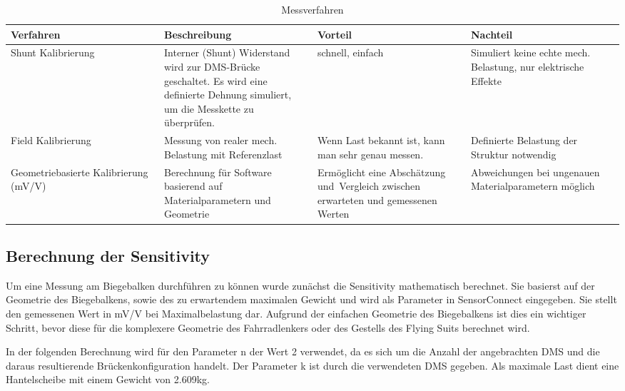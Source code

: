 \bgroup
\def\arraystretch{2}
\begin{table}[h]
\centering
\begin{tabular}{|p{0.25\linewidth}|p{0.25\linewidth}|p{0.25\linewidth}|p{0.25\linewidth}|}
\hline
Verfahren & Beschreibung & Vorteil & Nachteil\\ \hline
Shunt Kalibrierung & Interner (Shunt) Widerstand wird zur DMS-Brücke geschaltet. Es wird eine definierte Dehnung simuliert, um die Messkette zu überprüfen.
& schnell, einfach & Simuliert keine echte mech. Belastung, nur elektrische Effekte
\\ \hline
Field Kalibrierung & Messung von realer mech. Belastung mit Referenzlast

& Wenn Last bekannt ist, kann man sehr genau messen.
& Definierte Belastung der Struktur notwendig

\\ \hline
Geometriebasierte Kalibrierung (mV/V)
 & Berechnung für Software basierend auf Materialparametern und Geometrie


& Ermöglicht eine Abschätzung und Vergleich zwischen erwarteten und gemessenen Werten

& Abweichungen bei ungenauen Materialparametern möglich


\\ \hline

\end{tabular}
\caption{Messverfahren}
\label{tbl:verfahren}

\end{table}
\egroup


\subsection{Berechnung der Sensitivity}
Um eine Messung am Biegebalken durchführen zu können wurde zunächst die Sensitivity mathematisch berechnet.
Sie basierst auf der Geometrie des Biegebalkens, sowie des zu erwartendem maximalen Gewicht und wird als Parameter in SensorConnect eingegeben.
Sie stellt den gemessenen Wert in mV/V bei Maximalbelastung dar.
Aufgrund der einfachen Geometrie des Biegebalkens ist dies ein wichtiger Schritt, bevor diese für die komplexere Geometrie des Fahrradlenkers oder des Gestells des Flying Suits berechnet wird.

In der folgenden Berechnung wird für den Parameter n der Wert 2 verwendet, da es sich um die Anzahl der angebrachten DMS und die daraus resultierende Brückenkonfiguration handelt.
Der Parameter k ist durch die verwendeten DMS gegeben. Als maximale Last dient eine Hantelscheibe mit einem Gewicht von 2.609kg.

